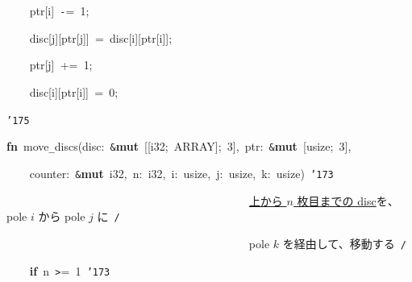 \documentclass[a4paper,10pt]{article}
\def\mc{\relax}
\begin{document}
\noindent
\mbox{}{\tt\mc \ }{\tt\mc \ }{\tt\mc \ }{\tt\mc \ }ptr[i]{\tt\mc \ }{\tt -}={\tt\mc \ }1;

\noindent
\mbox{}{\tt\mc \ }{\tt\mc \ }{\tt\mc \ }{\tt\mc \ }disc[j][ptr[j]]{\tt\mc \ }={\tt\mc \ }disc[i][ptr[i]];

\noindent
\mbox{}{\tt\mc \ }{\tt\mc \ }{\tt\mc \ }{\tt\mc \ }ptr[j]{\tt\mc \ }+={\tt\mc \ }1;

\noindent
\mbox{}{\tt\mc \ }{\tt\mc \ }{\tt\mc \ }{\tt\mc \ }disc[i][ptr[i]]{\tt\mc \ }={\tt\mc \ }0;

\noindent
\mbox{}{\tt\char'175}

\noindent
\mbox{}\hfill

\noindent
\mbox{}\textbf{fn}{\tt\mc \ }move{\tt\_}discs(disc:{\tt\mc \ }{\tt\&}\textbf{mut}{\tt\mc \ }[[i32;{\tt\mc \ }ARRAY];{\tt\mc \ }3],{\tt\mc \ }ptr:{\tt\mc \ }{\tt\&}\textbf{mut}{\tt\mc \ }[usize;{\tt\mc \ }3],

\noindent
\mbox{}{\tt\mc \ }{\tt\mc \ }{\tt\mc \ }{\tt\mc \ }counter:{\tt\mc \ }{\tt\&}\textbf{mut}{\tt\mc \ }i32,{\tt\mc \ }n:{\tt\mc \ }i32,{\tt\mc \ }i:{\tt\mc \ }usize,{\tt\mc \ }j:{\tt\mc \ }usize,{\tt\mc \ }k:{\tt\mc \ }usize){\tt\mc \ }{\tt\char'173}

\noindent
\mbox{}{\tt\mc \ }{\tt\mc \ }{\tt\mc \ }{\tt\mc \ }{\tt\mc \ }{\tt\mc \ }{\tt\mc \ }{\tt\mc \ }{\tt\mc \ }{\tt\mc \ }{\tt\mc \ }{\tt\mc \ }{\tt\mc \ }{\tt\mc \ }{\tt\mc \ }{\tt\mc \ }{\tt\mc \ }{\tt\mc \ }{\tt\mc \ }{\tt\mc \ }{\tt\mc \ }{\tt\mc \ }{\tt\mc \ }{\tt\mc \ }{\tt\mc \ }{\tt\mc \ }{\tt\mc \ }{\tt\mc \ }{\tt\mc \ }{\tt\mc \ }{\tt\mc \ }{\tt\mc \ }{\tt\mc \ }{\tt\mc \ }{\tt\mc \ }{\tt\mc \ }{\tt\mc \ }{\tt\mc \ }{\tt\mc \ }{\tt\mc \ }\rm\mc {\tt /}{\tt *}\  \ \underline{\textsf{上から $n$ 枚目までの disc}}を、pole $i$ から pole $j$ に\hfill \rm\mc \ {\tt *}{\tt /}
\tt\mc 

\noindent
\mbox{}{\tt\mc \ }{\tt\mc \ }{\tt\mc \ }{\tt\mc \ }{\tt\mc \ }{\tt\mc \ }{\tt\mc \ }{\tt\mc \ }{\tt\mc \ }{\tt\mc \ }{\tt\mc \ }{\tt\mc \ }{\tt\mc \ }{\tt\mc \ }{\tt\mc \ }{\tt\mc \ }{\tt\mc \ }{\tt\mc \ }{\tt\mc \ }{\tt\mc \ }{\tt\mc \ }{\tt\mc \ }{\tt\mc \ }{\tt\mc \ }{\tt\mc \ }{\tt\mc \ }{\tt\mc \ }{\tt\mc \ }{\tt\mc \ }{\tt\mc \ }{\tt\mc \ }{\tt\mc \ }{\tt\mc \ }{\tt\mc \ }{\tt\mc \ }{\tt\mc \ }{\tt\mc \ }{\tt\mc \ }{\tt\mc \ }{\tt\mc \ }\rm\mc {\tt /}{\tt *}\  \ pole $k$ を経由して、移動する\hfill \rm\mc \ {\tt *}{\tt /}
\tt\mc 

\noindent
\mbox{}{\tt\mc \ }{\tt\mc \ }{\tt\mc \ }{\tt\mc \ }\textbf{if}{\tt\mc \ }n{\tt\mc \ }{\tt >}={\tt\mc \ }1{\tt\mc \ }{\tt\char'173}
\end{document}
